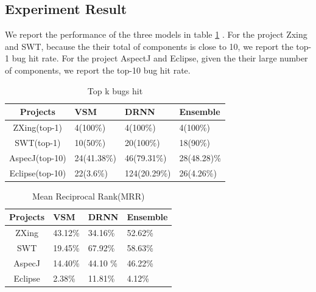\subsection{Experiment Result}

We report the performance of the three models in table \ref{performance_top_k} .
For the project Zxing and SWT, because the their total of components is close to 10, we report the top-1 bug hit rate.
For the project AspectJ and Eclipse, given the their large  number of components, we report the top-10 bug hit rate.

 \begin{table}[h]
 	\begin{center}
 		\caption{Top k bugs hit}
 		\label{performance_top_k}
 		
 		\begin{tabular}{c|l|l|l} %
 			 \textbf{Projects} & \textbf{VSM} & \textbf{DRNN} & \textbf{Ensemble} \\
 			\hline\hline
 			ZXing(top-1)& 4(100\%)&4(100\%) &4(100\%) \\
 			
 			SWT(top-1) & 10(50\%) & 20(100\%) &18(90\%)\\
 			
 			AspecJ(top-10) & 24(41.38\%)  & 46(79.31\%) & 28(48.28)\%\\
 			
 			Eclipse(top-10) &22(3.6\%) & 124(20.29\%)& 26(4.26\%)\\
 			
 		\end{tabular}
 	\end{center}
 \end{table}

 \begin{table}[h]
 	\begin{center}
 		\caption{Mean Reciprocal Rank(MRR)}
 		\label{performance_MRR}
 		
 		\begin{tabular}{c|l|l|l} %
 			\textbf{Projects} & \textbf{VSM} & \textbf{DRNN} & \textbf{Ensemble} \\
 			\hline\hline
 			ZXing& 43.12\%&34.16\% &52.62\% \\
 			
 			SWT & 19.45\% & 67.92\% & 58.63\% \\
 			
 			AspecJ &14.40\%  & 44.10 \% & 46.22\%\\
 			
 			Eclipse &2.38\% & 11.81\%& 4.12\% \\
 			
 		\end{tabular}
 	\end{center}
 \end{table}

